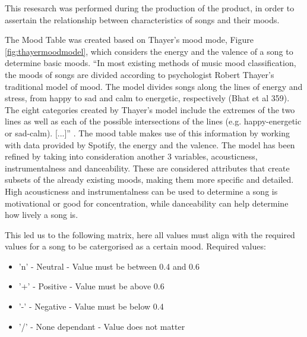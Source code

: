 \documentclass[10pt]{report}
\begin{document}
This resesarch was performed during the production of the product, in order to assertain the relationship between characteristics of songs and their moods.\newline

The Mood Table was created based on Thayer’s mood mode, Figure \ref{fig:thayermoodmodel}, which considers the energy and the valence of a song to determine basic moods. “In most existing methods of music mood classification, the moods of songs are divided according to psychologist Robert Thayer’s traditional model of mood. The model divides songs along the lines of energy and stress, from happy to sad and calm to energetic, respectively (Bhat et al 359). The eight categories created by Thayer’s model include the extremes of the two lines as well as each of the possible intersections of the lines (e.g. happy-energetic or sad-calm). [...]” \cite{Nuzzolo2015}. The mood table makes use of this information by working with data provided by Spotify, the energy and the valence. The model has been refined by taking into consideration another 3 variables, acousticness, instrumentalness and danceability. These are considered attributes that create subsets of the already existing moods, making them more specific and detailed. High acousticness and instrumentalness can be used to determine a song is motivational or good for concentration, while danceability can help determine how lively a song is. 

This led us to the following matrix, here all values must align with the required values for a song to be catergorised as a certain mood.
Required values:
\begin{itemize}
\item 'n' - Neutral - Value must be between 0.4 and 0.6
\item '+' - Positive - Value must be above 0.6
\item '-' - Negative - Value must be below 0.4
\item '/' - None dependant - Value does not matter
\end{itemize} 
\end{document}
